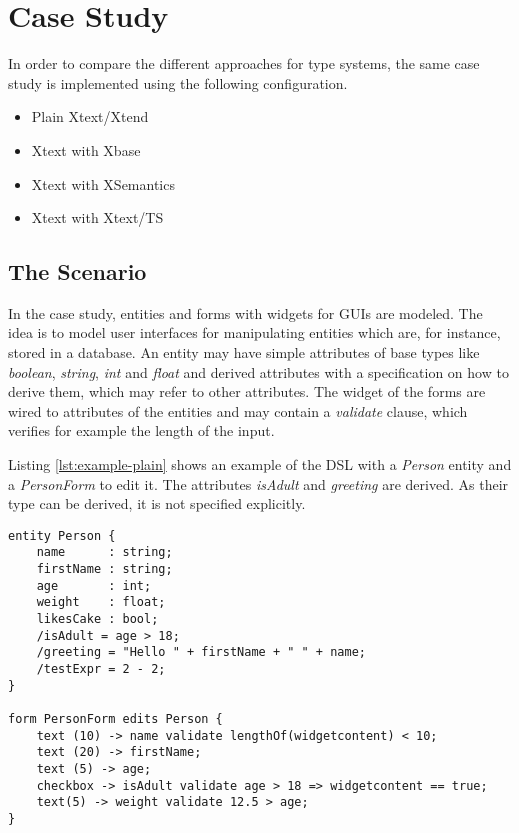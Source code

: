\section{Case Study}
\label{sec:casestudy}

In order to compare the different approaches for type systems, the same case study is implemented using the following configuration.

\begin{itemize}
\item Plain Xtext/Xtend
\item Xtext with Xbase
\item Xtext with XSemantics
\item Xtext with Xtext/TS
\end{itemize}

\subsection{The Scenario}
In the case study, entities and forms with widgets for GUIs are modeled. The idea is to model user interfaces for manipulating entities which are, for instance, stored in a database. An entity may have simple attributes of base types like \emph{boolean}, \emph{string}, \emph{int} and \emph{float} and derived attributes with a specification on how to derive them, which may refer to other attributes. The widget of the forms are wired to attributes of the entities and may contain a \emph{validate} clause, which verifies for example the length of the input.

Listing \ref{lst:example-plain} shows an example of the DSL with a \emph{Person} entity and a \emph{PersonForm} to edit it. The attributes \emph{isAdult} and \emph{greeting} are derived. As their type can be derived, it is not specified explicitly.

%

\begin{lstlisting}[language=guidsl,float,label=lst:example-plain,caption=Forms
and Entities DSL] 
entity Person {
	name      : string;
	firstName : string;
	age       : int; 
	weight    : float;
	likesCake : bool; 
	/isAdult = age > 18;
	/greeting = "Hello " + firstName + " " + name;
	/testExpr = 2 - 2;
}

form PersonForm edits Person {
	text (10) -> name validate lengthOf(widgetcontent) < 10;
	text (20) -> firstName;
	text (5) -> age;
	checkbox -> isAdult validate age > 18 => widgetcontent == true;
	text(5) -> weight validate 12.5 > age;
}
\end{lstlisting}


